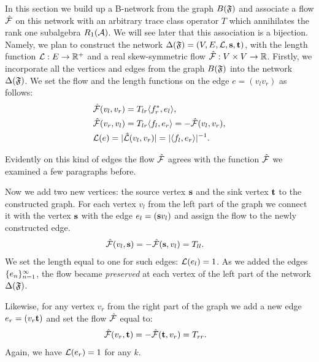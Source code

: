 \documentclass[12pt,oneside,a4paper]{amsart}
\begin{document}
      In this section we build up a B-network from the graph $B(\fsys)$ and associate a flow $\flow$ on this network with 
        an arbitrary trace class operator $T$ which annihilates the rank one subalgebra $R_1(\cal{A})$.
      We will see later that this association is a bijection.
      Namely, we plan to construct the network $\net(\fsys) = (V, E, \len, \source, \sink)$,
        with the length function $\len: E \to \mathbb{R}^{+}$ and a real skew-symmetric flow $\flow: V \times V \to \mathbb{R}$.
      Firstly, we incorporate all the vertices and edges from the graph $B(\fsys)$ into the network $\net(\fsys)$.
      We set the flow and the length functions on the edge $e = (v_l v_r)$ as follows:
      \begin{align*}
        &\flow(v_l, v_r) = T_{lr} \inner{f^*_r}{e_l},\\
        &\flow(v_r, v_l) = T_{lr} \inner{f_l}{e_r} = -\flow(v_l, v_r),\\
        &\len(e) = \lvert \wt(v_l, v_r) \rvert =  \lvert\inner{f_l}{e_r}\rvert^{-1}.
      \end{align*}
      \begin{remark}
        Evidently on this kind of edges the flow $\flow$ agrees with the function $\flowsgn$
          we examined a few paragraphs before.
      \end{remark}

      Now we add two new vertices: the source vertex $\source$ and the sink vertex $\sink$ to the constructed graph.
      For each vertex $v_l$ from the left part of the graph we connect it with the vertex $\source$ with the edge $e_l = (\source v_l)$
        and assign the flow to the newly constructed edge.
      \begin{align*}
        &\flow(v_l, \source) = -\flow(\source, v_l) = T_{ll}.
      \end{align*}
      We set the length equal to one for such edges: $\len(e_l) = 1$.
      As we added the edges $\seq{e}$, the flow became \emph{preserved} at each vertex of the left part of the network $\net(\fsys)$.

      Likewise, for any vertex $v_r$ from the right part of the graph we add a new edge $e_r=(v_r \sink)$
        and set the flow $\flow$ equal to:
      \begin{align*}
        &\flow(v_r, \sink) = -\flow(\sink, v_r) =  T_{rr}.
      \end{align*}
      Again, we have $\len(e_r) = 1$ for any $k$.
\end{document}
